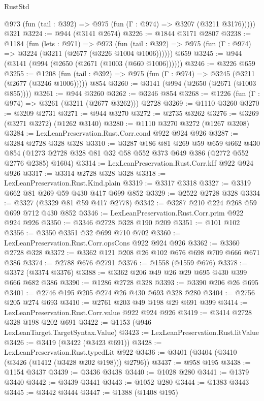 \begin{lexlean}{RustStd}
\begin{coremodule}
      @973 (fun (tail : @392) => @975 (fun (Γ : @974) => @3207 (@3211 @3176)))))
    @321
@3224 := @944 (@3141 @2674)
@3226 := @1844 @3171 @2807
@3238 := @1184
    (fun (lets : @971) =>
    @973 (fun (tail : @392) => @975 (fun (Γ : @974) => @3224 (@3211 (@2677 (@3226 @1004 @1006))))))
    @659
@3245 := @944 (@3141 (@994 (@2650 (@2671 (@1003 (@660 @1006))))))
@3246 := @3226 @659
@3255 := @1208
    (fun (tail : @392) => @975 (fun (Γ : @974) => @3245 (@3211 (@2677 (@3246 @1006)))))
    @854
@3260 := @3141 (@994 (@2650 (@2671 (@1003 @855))))
@3261 := @944 @3260
@3262 := @3246 @854
@3268 := @1226 (fun (Γ : @974) => @3261 (@3211 (@2677 @3262))) @2728
@3269 := @1110 @3260
@3270 := @3209 @2731
@3271 := @944 @3270
@3272 := @2735 @3262
@3276 := @3269 (@3271 @3272) (@1262 @3140)
@3280 := @1110 @3270 @3272 (@1267 @3208)
@3284 := LexLeanPreservation.Rust.Corr.cond @922 @924 @926
@3287 := @3284 @2728 @328 @328
@3310 := @3287
    @186
    @81
    @269
    @59
    @659
    @662
    @430
    @854
    (@1273 @2728 @328 @81 @32 @58 @552 @373 @649 @386 (@2772 @552 @2776 @2385) @1604)
@3314 := LexLeanPreservation.Rust.Corr.kIf @922 @924 @926
@3317 := @3314 @2728 @328 @328
@3318 := LexLeanPreservation.Rust.Kind.plain
@3319 := @3317 @3318
@3327 := @3319 @662 @81 @269 @59 @430 @417 @699 @852
@3329 := @2522 @2728 @328
@3334 := @3327 (@3329 @81 @59 @417 @2778)
@3342 := @3287 @210 @224 @268 @59 @699 @712 @430 @852
@3346 := LexLeanPreservation.Rust.Corr.prim @922 @924 @926
@3350 := @3346 @2728 @328 @190 @209
@3351 := @101 @102
@3356 := @3350 @3351 @32 @699 @710 @702
@3360 := LexLeanPreservation.Rust.Corr.opsCons @922 @924 @926
@3362 := @3360 @2728 @328
@3372 := @3362 @121 @208 @26 @102 @676 @698 @709 @666 @671 @386
@3374 := @2788 @676 @2791
@3376 := @1558 (@1559 @676)
@3378 := @3372 (@3374 @3376)
@3388 := @3362 @206 @49 @26 @29 @695 @430 @399 @666 @682 @386
@3390 := @1286 @2728 @328
@3393 := @3390 @206 @26 @695
@3401 := @2746 @195 @205 @274 @26 @430 @693 @328 @280
@3404 := @2756 @205 @274 @693
@3410 := @2761 @203 @49 @198 @29 @691 @399
@3414 := LexLeanPreservation.Rust.Corr.value @922 @924 @926
@3419 := @3414 @2728 @328 @198 @202 @691
@3422 := @1153 (@946 LexLeanTarget.TargetSyntax.Value)
@3423 := LexLeanPreservation.Rust.litValue
@3426 := @3419 (@3422 (@3423 @691))
@3428 := LexLeanPreservation.Rust.typedLit @922
@3436 := @3401 (@3404 (@3410 (@3426 (@1412 (@3428 @202 @198))) @2796))
@3437 := @958 @195
@3438 := @1154 @3437
@3439 := @3436 @3438
@3440 := @1028 @280
@3441 := @1379 @3440
@3442 := @3439 @3441
@3443 := @1052 @280
@3444 := @1383 @3443
@3445 := @3442 @3444
@3447 := @1388 (@1408 @195)

\end{coremodule}
\end{lexlean}
